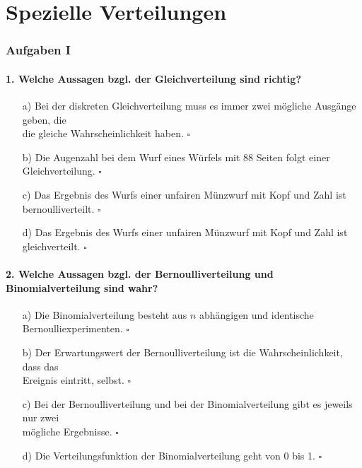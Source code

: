 \documentclass[a4paper]{article}
\begin{document}
\clearpage


\section{Spezielle Verteilungen} \label{sec:Distr}

\subsubsection{Aufgaben I}
\paragraph{1. Welche Aussagen bzgl. der Gleichverteilung sind richtig? }
\begin{itemize}
    \item[a)] Bei der diskreten Gleichverteilung muss es immer zwei mögliche Ausgänge geben, die\\ die gleiche Wahrscheinlichkeit haben. \hfill $\square$
    \item[b)] Die Augenzahl bei dem Wurf eines Würfels mit 88 Seiten folgt einer Gleichverteilung. \hfill $\square$
    \item[c)] Das Ergebnis des Wurfs einer unfairen Münzwurf mit Kopf und Zahl ist bernoulliverteilt. \hfill $\square$
    \item[d)] Das Ergebnis des Wurfs einer unfairen Münzwurf mit Kopf und Zahl ist gleichverteilt. \hfill $\square$
\end{itemize}

\paragraph{2. Welche Aussagen bzgl. der Bernoulliverteilung und Binomialverteilung sind wahr?}
\begin{itemize}
    \item[a)] Die Binomialverteilung besteht aus $n$ abhängigen und identische Bernoulliexperimenten. \hfill $\square$
    \item[b)] Der Erwartungswert der Bernoulliverteilung ist die Wahrscheinlichkeit, dass das\\ Ereignis eintritt, selbst. \hfill $\square$
    \item[c)] Bei der Bernoulliverteilung und bei der Binomialverteilung gibt es jeweils nur zwei\\ mögliche Ergebnisse. \hfill $\square$
    \item[d)] Die Verteilungsfunktion der Binomialverteilung geht von 0 bis 1. \hfill $\square$
\end{itemize}
\end{document}
